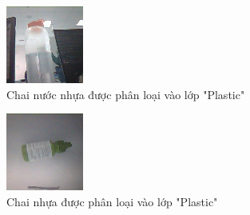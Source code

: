 \begin{figure}[H]
    \centering
    \includegraphics[width=\linewidth]{images/Quanh/plastic.bmp}
    \caption{ Chai nước nhựa được phân loại vào lớp "Plastic" }
    \label{fig:Dplastic}
\end{figure}

\begin{figure}[H]
    \centering
    \includegraphics[width=\linewidth]{images/Quanh/plastic2.bmp}
    \caption{ Chai nhựa được phân loại vào lớp "Plastic" }
    \label{fig:Dplastic2}
\end{figure}

